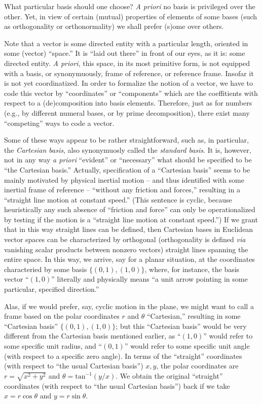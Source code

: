 What particular basis should one choose?
{\em A priori} no basis is privileged over the other.
Yet, in view of certain (mutual) properties of elements of some bases (such as orthogonality or orthonormality)
we shall prefer (s)ome over others.


Note that a vector is some directed entity with a particular length,
oriented in some (vector) ``space.''
It is ``laid out there'' in front of our eyes, as it is: some directed entity.
{\it A priori}, this space, in its most primitive form,
is not equipped with a basis, or synonymuously, frame of reference, or reference frame.
Insofar it is not yet coordinatized.
In order to formalize the notion of a vector, we have to code this vector by ``coordinates''
or ``components'' which are the coeffitients with respect to a (de)composition into basis elements.
Therefore, just as for numbers (e.g., by different numeral bases, or by prime decomposition),
there exist many ``competing'' ways to code a vector.

Some of these ways appear to be rather straightforward,
such as, in particular, the {\em Cartesian basis},
also synonymuosly called the  {\em standard basis}.
It is, however, not in any way {\it a priori}
``evident'' or ``necessary'' what should be specified to be ``the Cartesian basis.''
Actually, specification of a ``Cartesian basis'' seems to be mainly motivated by
physical inertial motion --
and thus identified with some inertial frame of reference --
``without any friction and
forces,'' resulting in a ``straight line motion at constant speed.''
(This sentence is  cyclic, because heuristically any such absence of ``friction and
force''  can only be operationalized by testing if the motion is a
``straight line motion at constant speed.'')
If we grant that in this way straight lines can be defined, then
Cartesian bases in Euclidean vector spaces can be characterized by
orthogonal (orthogonality is defined {\it via} vanishing scalar products between nonzero vectors)
straight lines spanning the entire space.
In this way, we arrive, say for a planar situation, at the coordinates
characteried by some basis $\{(0,1),(1,0)\}$,
where, for instance, the basis vector ``$(1,0)$'' literally and physically
means ``a unit arrow pointing in some particular, specified direction.''

Alas, if we would prefer, say, cyclic motion in the plane,
we might want to call a frame based on the polar coordinates $r$ and $\theta$ ``Cartesian,''
resulting in some ``Cartesian basis'' $\{(0,1),(1,0)\}$;
but this ``Cartesian basis'' would be very different from the Cartesian
basis mentioned earlier,
as ``$(1,0)$'' would refer to some specific unit radius,
and ``$(0,1)$'' would refer to some specific unit angle (with respect to a specific zero angle).
In terms of the ``straight'' coordinates (with respect to ``the usual Cartesian basis'')
$x,y$, the polar coordinates are $r = \sqrt{x^2+y^2}$ and $\theta = \mathrm{tan}^{-1} (y/x)$.
We obtain the original ``straight'' coordinates (with respect to ``the usual Cartesian basis'')
back if we take
$x=r\cos \theta$
and
$y=r\sin \theta$.

